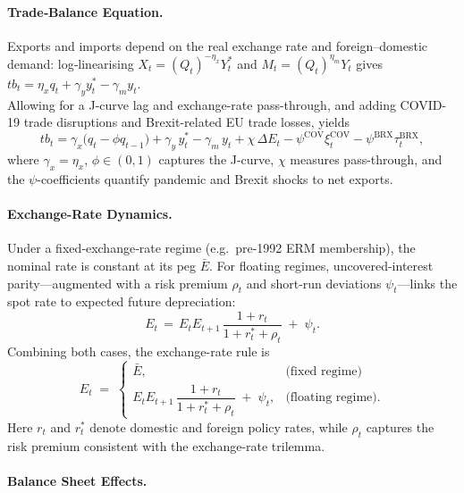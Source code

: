 \documentclass[
]{article}
\begin{document}
	
	\paragraph*{Trade‐Balance Equation.}
	Exports and imports depend on the real exchange rate and foreign–domestic demand: log‐linearising \(X_t=(Q_t)^{-\eta_x}Y_t^{*}\) and \(M_t=(Q_t)^{\eta_m}Y_t\) gives \(tb_t=\eta_x q_t+\gamma_y y_t^{*}-\gamma_m y_t\). \\
	Allowing for a J-curve lag and exchange-rate pass-through, and adding COVID-19 trade disruptions and Brexit-related EU trade losses, yields
	\begin{equation}
		tb_t
		= \gamma_x\bigl(q_t-\phi q_{t-1}\bigr)
		+ \gamma_y\,y_t^{*}
		- \gamma_m\,y_t
		+ \chi\,\Delta E_t
		- \psi^{\mathrm{COV}}\xi_t^{\mathrm{COV}}
		- \psi^{\mathrm{BRX}}\tau_t^{\mathrm{BRX}},
		\label{eq:tb_condensed}
	\end{equation}
	where \(\gamma_x=\eta_x\), \(\phi\in(0,1)\) captures the J-curve, \(\chi\) measures pass-through, and the \(\psi\)-coefficients quantify pandemic and Brexit shocks to net exports.
	
	\paragraph*{Exchange-Rate Dynamics.}
	Under a fixed‐exchange‐rate regime (e.g.\ pre-1992 ERM membership), the nominal rate is constant at its peg \(\bar{E}\). For floating regimes, uncovered-interest parity—augmented with a risk premium \(\rho_t\) and short-run deviations \(\psi_t\)—links the spot rate to expected future depreciation:
	\[
	E_t\,=\,
	E_t E_{t+1}\,\frac{1+r_t}{1+r_t^{*}+\rho_t}\;+\;\psi_t.
	\]
	Combining both cases, the exchange-rate rule is
	\begin{equation}
		E_t \;=\;
		\begin{cases}
			\bar{E}, &
			\text{(fixed regime)}\\[4pt]
			E_t E_{t+1}\,\dfrac{1+r_t}{1+r_t^{*}+\rho_t}\;+\;\psi_t, &
			\text{(floating regime).}
		\end{cases}
		\label{eq:uip_condensed}
	\end{equation}
	Here \(r_t\) and \(r_t^{*}\) denote domestic and foreign policy rates, while \(\rho_t\) captures the risk premium consistent with the exchange-rate trilemma.
	
	\paragraph*{Balance Sheet Effects.}
	
\end{document}
